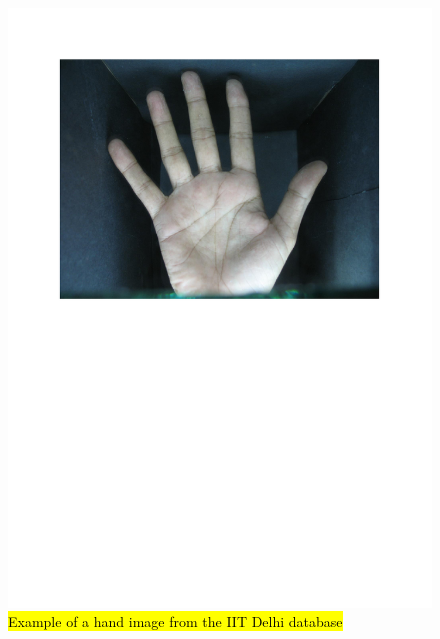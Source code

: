 \documentclass[review]{elsarticle}
\begin{document}
		\begin{figure}[!h]
		    \centering
		    \includegraphics[page=2,scale=.57,trim=1cm 14.7cm 1cm 1.7cm,clip]{IIT_samples.pdf}
		    \caption{\hl{Example of a hand image from the IIT Delhi database}}
		    \label{fig:IIT_hand1}
		\end{figure}
\end{document}
